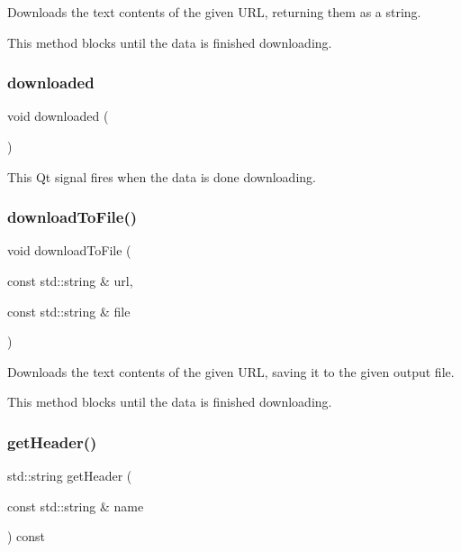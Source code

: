 Downloads the text contents of the given U\+RL, returning them as a string. 

This method blocks until the data is finished downloading. \mbox{\label{classGDownloader_abb5cf1dbe464e3dc8943c261934b9a64}} 
\subsubsection{\texorpdfstring{downloaded}{downloaded}}
{\footnotesize\ttfamily void downloaded (\begin{DoxyParamCaption}{ }\end{DoxyParamCaption})\hspace{0.3cm}{\ttfamily [signal]}}



This Qt signal fires when the data is done downloading. 

\mbox{\label{classGDownloader_a0bf57f044cc66c8aab40f3f2179caf21}} 
\subsubsection{\texorpdfstring{download\+To\+File()}{downloadToFile()}}
{\footnotesize\ttfamily void download\+To\+File (\begin{DoxyParamCaption}\item[{const std\+::string \&}]{url,  }\item[{const std\+::string \&}]{file }\end{DoxyParamCaption})}



Downloads the text contents of the given U\+RL, saving it to the given output file. 

This method blocks until the data is finished downloading. \mbox{\label{classGDownloader_a736d777b29179f52ba753317d84b1087}} 
\subsubsection{\texorpdfstring{get\+Header()}{getHeader()}}
{\footnotesize\ttfamily std\+::string get\+Header (\begin{DoxyParamCaption}\item[{const std\+::string \&}]{name }\end{DoxyParamCaption}) const}



